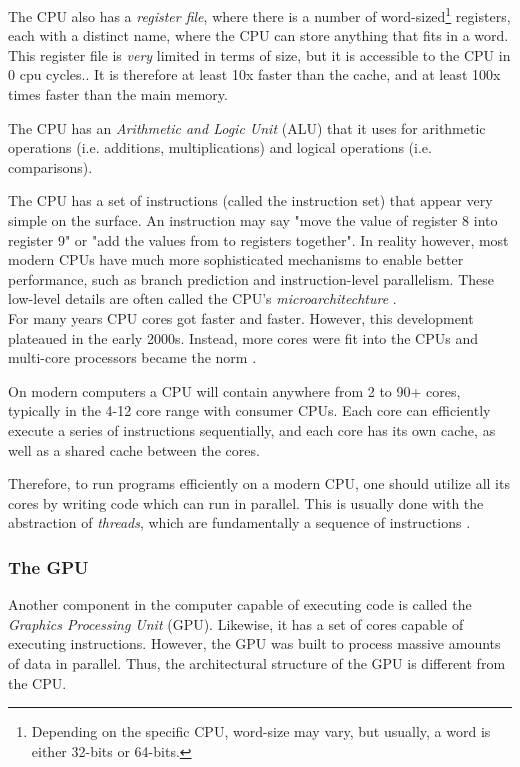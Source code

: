 The CPU also has a \textit{register file}, where there is a number of word-sized\footnote{Depending on the specific CPU, word-size may vary, but usually, a word is either 32-bits or 64-bits.} registers, each with a distinct name, where the CPU can store anything that fits in a word. This register file is \textit{very} limited in terms of size, but it is accessible to the CPU in 0 cpu cycles.\cite[p. 9-10]{computersystems}. It is therefore at least 10x faster than the cache, and at least 100x times faster than the main memory.

The CPU has an \textit{Arithmetic and Logic Unit} (ALU) that it uses for arithmetic operations (i.e. additions, multiplications) and logical operations (i.e. comparisons).

The CPU has a set of instructions (called the instruction set) that appear very simple on the surface. An instruction may say "move the value of register 8 into register 9" or "add the values from to registers together". In reality however, most modern CPUs have much more sophisticated mechanisms to enable better performance, such as branch prediction and instruction-level parallelism. These low-level details are often called the CPU's \textit{microarchitechture} \cite[p. 10]{computersystems}.\\

\noindent For many years CPU cores got faster and faster. However, this development plateaued in the early 2000s. Instead, more cores were fit into the CPUs and multi-core processors became the norm \cite{karlrupp:processor_trend_data}.

On modern computers a CPU will contain anywhere from 2 to 90+ cores, typically in the 4-12 core range with consumer CPUs. Each core can efficiently execute a series of instructions sequentially, and each core has its own cache, as well as a shared cache between the cores.

Therefore, to run programs efficiently on a modern CPU, one should utilize all its cores by writing code which can run in parallel. This is usually done with the abstraction of \textit{threads}, which are fundamentally a sequence of instructions \cite[p. 1022]{computersystems}.

\subsubsection{The GPU} \label{background_gpu}

\noindent Another component in the computer capable of executing code is called the \textit{Graphics Processing Unit} (GPU). Likewise, it has a set of cores capable of executing instructions. However, the GPU was built to process massive amounts of data in parallel. Thus, the architectural structure of the GPU is different from the CPU.

